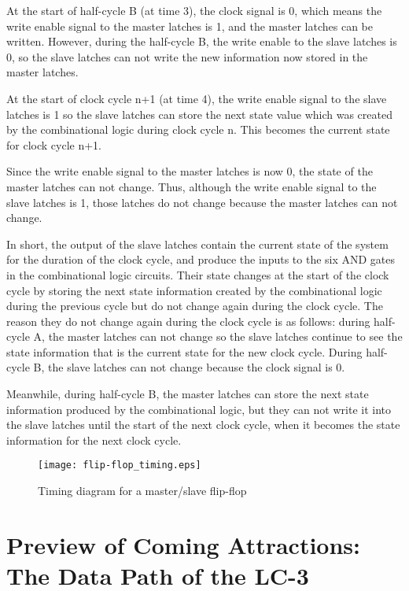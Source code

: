 \documentclass{patt}
\begin{document}
At the start of half-cycle B (at time 3), the clock signal is 0, which means 
the write enable signal to the master latches is 1, and the master 
latches can be written.  However, during the half-cycle B, the write enable 
to the slave latches is 0, so the slave latches can not write the new 
information now stored in the master latches.

At the start of clock cycle n+1 (at time 4), the write enable signal to the 
slave latches is 1 so the slave latches can store the next state value which 
was created by the combinational logic during clock cycle n. This becomes the
current state for clock cycle n+1.  

Since the write enable signal to the master latches is now 0, the state of 
the master latches can not change.  Thus, although the write enable signal 
to the slave latches is 1, those latches do not change because the master 
latches can not change.

In short, the output of the slave latches contain the current state of the
system for the duration of the clock cycle, and produce the inputs to the six
AND gates in the combinational logic circuits.  Their state changes at the 
start of the clock cycle by storing the next state information created by the
combinational logic during the previous cycle but do not change again during
the clock cycle.  The reason they do not change again during the clock cycle
is as follows: during half-cycle A, the master latches can not change so the
slave latches continue to see the state information that is the current state
for the new clock cycle.  During half-cycle B, the slave latches can not change
because the clock signal is 0.  

Meanwhile, during half-cycle B, the master latches can store the next state
information produced by the combinational logic, but they can not write it into
the slave latches until the start of the next clock cycle, when it becomes 
the state information for the next clock cycle.

\begin{figure}
\centerline{\texttt{[image: flip-flop\_timing.eps]}}
\caption{Timing diagram for a master/slave flip-flop}
\label{fig:flip-flop_timing}
\vspace{12pt}
\end{figure}

\FloatBarrier

\section{Preview of Coming Attractions: The Data Path of the LC-3}
\end{document}
